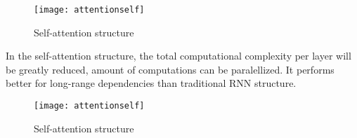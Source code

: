 \begin{figure}[h]
	\centering
	\texttt{[image: attentionself]}
	\caption{Self-attention structure}
\end{figure}

In the self-attention structure, the total computational complexity per layer will be greatly reduced, amount of computations can be paralellized. It performs better for long-range dependencies than traditional RNN structure.

\begin{figure}[h]
	\centering
	\texttt{[image: attentionself]}
	\caption{Self-attention structure}
\end{figure}

%
%



